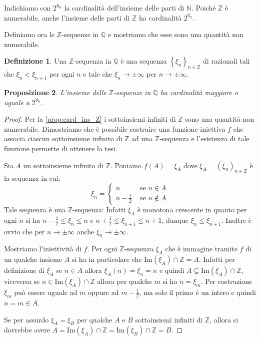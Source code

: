 \documentclass[12pt,a4paper,openright]{report}
\newcommand{\N}{\mathbb{N}} %
\newcommand{\Z}{\mathbb{Z}} %
\newcommand{\Q}{\mathbb{Q}} %
\newcommand{\0}{\setminus\{0\}} %
\theoremstyle{definition}
\newtheorem{defn}{Definizione}[chapter]
\theoremstyle{plain}
\newtheorem{prop}[defn]{Proposizione}
\begin{document}
Indichiamo con $2^{\aleph_0}$ la cardinalità dell'insieme delle parti di $\N$. Poiché $\Z$ è numerabile, anche l'insieme delle parti di $\Z$ ha cardinalità $2^{\aleph_0}$.

Definiamo ora le $\Z$-sequenze in $\Q$ e mostriamo che esse sono una quantità non numerabile.
\begin{defn}
Una $\Z$-sequenza in $\Q$ è una sequenza $\left\{\xi_n \right\}_{n \in \Z}$ di razionali tali che $\xi_n<\xi_{n+1}$ per ogni $n$ e tale che $\xi_n \rightarrow \pm \infty$ per $n \rightarrow \pm \infty$.
\end{defn}
\begin{prop} \label{prop:card_Z_seq}
    L'insieme delle $\Z$-sequenze in $\Q$ ha cardinalità maggiore o uguale a $2^{\aleph_0}$.
\end{prop}
\begin{proof}
Per la \cref{prop:card_ins_Z} i sottoinsiemi infiniti di $\Z$ sono una quantità non numerabile. Dimostriamo che è possibile costruire una funzione iniettiva $f$ che associa ciascun sottoinsieme infinito di $\Z$ ad una $\Z$-sequenza e l'esistenza di tale funzione permette di ottenere la tesi.

Sia $A$ un sottoinsieme infinito di $\Z$. Poniamo $f(A)=\xi_A$ dove $\xi_A=\left(\xi_n\right)_{n \in \Z}$ è la sequenza in cui:
\[ \xi_n=\begin{cases}n & \mbox{ se } n \in A \\ n-\frac{1}{2} & \mbox{ se } n \notin A \end{cases}\]
Tale sequenza è una $\Z$-sequenza: Infatti $\xi_A$ è monotona crescente in quanto per ogni $n$ si ha $n-\frac{1}{2}\leq \xi_n \leq n$ e $n+\frac{1}{2}\leq \xi_{n+1} \leq n+1$, dunque $\xi_n \leq \xi_{n+1}$. Inoltre è ovvio che per $n \rightarrow \pm \infty$ anche $\xi_n \rightarrow \pm \infty$.

Mostriamo l'iniettività di $f$. Per ogni $\Z$-sequenza $\xi_A$ che è immagine tramite $f$ di un qualche insieme $A$ si ha in particolare che ${\mathrm{Im}(\xi_A) \cap \Z=A}$.
Infatti per definizione di $\xi_A$ se $n \in A$ allora $\xi_A(n)=\xi_n=n$ e quindi ${A \subseteq \mathrm{Im}(\xi_A) \cap \Z}$, viceversa se $n \in \mathrm{Im}(\xi_A) \cap \Z$ allora per qualche $m$ si ha $n=\xi_m$. Per costruzione $\xi_m$ può essere uguale ad $m$ oppure ad $m-\frac{1}{2}$, ma solo il primo è un intero e quindi $n=m \in A$.

Se per assurdo $\xi_A=\xi_B$ per qualche $A$ e $B$ sottoinsiemi infiniti di $\Z$, allora si dovrebbe avere $A=\mathrm{Im}(\xi_A) \cap \Z=\mathrm{Im}(\xi_B) \cap \Z=B$.
\end{proof}
\end{document}
